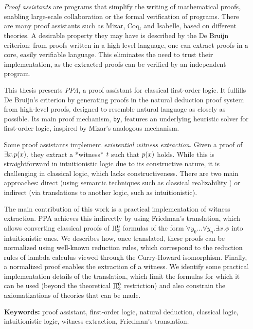 \chapter*{\runtitle}

\noindent \textit{Proof assistants} are programs that simplify the writing of
mathematical proofs, enabling large-scale collaboration or the formal
verification of programs. There are many proof assistants such as Mizar, Coq,
and Isabelle, based on different theories. A desirable property they may have is
described by the De Bruijn criterion: from proofs written in a high level
language, one can extract proofs in a core, easily verifiable language. This
eliminates the need to trust their implementation, as the extracted proofs can
be verified by an independent program.

This thesis presents \textit{PPA}, a proof assistant for classical first-order logic. It fulfills De Bruijn's criterion by generating proofs in the natural deduction proof system from high-level proofs, designed to resemble natural language as closely as possible. Its main proof mechanism, \texttt{by}, features an underlying heuristic solver for first-order logic, inspired by Mizar's analogous mechanism.

Some proof assistants implement \textit{existential witness extraction}. Given a
proof of $\exists x . p(x)$, they extract a *witness* \( t \) such
that \( p(x) \) holds. While this is straightforward in intuitionistic
logic due to its constructive nature, it is challenging in classical logic,
which lacks constructiveness. There are two main approaches: direct (using
semantic techniques such as classical realizability \cite{miquel-friedman}) or indirect
(via translations to another logic, such as intuitionistic).

The main contribution of this work is a practical implementation of witness
extraction. PPA achieves this indirectly by using Friedman's translation, which
allows converting classical proofs of \( \Pi^0_{2} \) formulas of the form \(
\forall y_0 \dots \forall y_n . \exists x . \phi \) into intuitionistic ones. We
describes how, once translated, these proofs can be normalized using well-known
reduction rules, which correspond to the reduction rules of lambda calculus viewed through the Curry-Howard isomorphism. Finally, a
normalized proof enables the extraction of a witness. We identify some practical
implementation details of the translation, which limit the formulas for which it
can be used (beyond the theoretical \( \Pi^0_{2} \) restriction) and also
constrain the axiomatizations of theories that can be made.

\bigskip

\noindent\textbf{Keywords:} proof assistant, first-order logic, natural deduction, classical logic, intuitionistic logic, witness extraction, Friedman's translation.